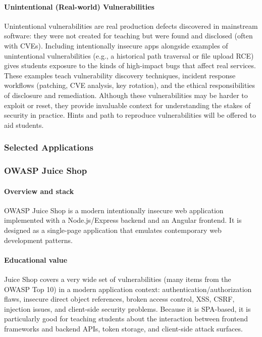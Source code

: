 \documentclass[12pt]{article}
\begin{document}
\paragraph{Unintentional (Real-world) Vulnerabilities}
Unintentional vulnerabilities are real production defects discovered in mainstream software: they were not created for teaching but were found and disclosed (often with CVEs). Including intentionally insecure apps alongside examples of unintentional vulnerabilities (e.g., a historical path traversal or file upload RCE) gives students exposure to the kinds of high-impact bugs that affect real services. These examples teach vulnerability discovery techniques, incident response workflows (patching, CVE analysis, key rotation), and the ethical responsibilities of disclosure and remediation. Although these vulnerabilities may be harder to exploit or reset, they provide invaluable context for understanding the stakes of security in practice. Hints and path to reproduce vulnerabilities will be offered to aid students.

\subsubsection{Selected Applications}

\subsubsection{OWASP Juice Shop}

\paragraph{Overview and stack}
OWASP Juice Shop is a modern intentionally insecure web application implemented with a Node.js/Express backend and an Angular frontend. It is designed as a single-page application that emulates contemporary web development patterns.

\paragraph{Educational value}
Juice Shop covers a very wide set of vulnerabilities (many items from the OWASP Top 10) in a modern application context: authentication/authorization flaws, insecure direct object references, broken access control, XSS, CSRF, injection issues, and client-side security problems. Because it is SPA-based, it is particularly good for teaching students about the interaction between frontend frameworks and backend APIs, token storage, and client-side attack surfaces.
\end{document}
